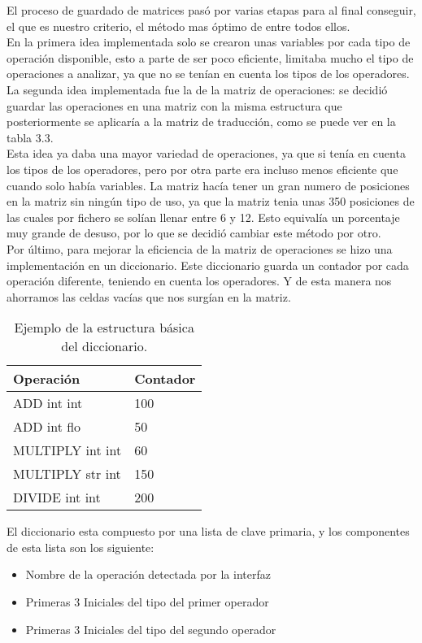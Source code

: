 El proceso de guardado de matrices pasó por varias etapas para al final conseguir, el que es nuestro criterio, el método mas óptimo de entre todos ellos.\\

En la primera idea implementada solo se crearon unas variables por cada tipo de operación disponible, esto a parte de ser poco eficiente, limitaba mucho el tipo de operaciones a analizar, ya que no se tenían en cuenta los tipos de los operadores.\\

La segunda idea implementada fue la de la  matriz de operaciones: se decidió guardar las operaciones en una matriz con la misma estructura que posteriormente se aplicaría a la matriz de traducción, como se puede ver en la tabla 3.3.\\

Esta idea ya daba una mayor variedad de operaciones, ya que si tenía en cuenta los tipos de los operadores, pero por otra parte era incluso menos eficiente que cuando solo había variables. La matriz hacía tener un gran numero de posiciones en la matriz sin ningún tipo de uso, ya que la matriz tenia unas 350 posiciones de las cuales por fichero se solían llenar entre 6 y 12. Esto equivalía un porcentaje muy grande de desuso, por lo que se decidió cambiar este método por otro.\\

Por último, para mejorar la eficiencia de la matriz de operaciones se hizo una implementación en un diccionario. Este diccionario guarda un contador por cada operación diferente, teniendo en cuenta los operadores. Y de esta manera nos ahorramos las celdas vacías que nos surgían en la matriz.\\

\begin{table}[H]
\begin{center}
\begin{tabular}{|l|l|}
\hline
Operación & Contador \\
\hline \hline
ADD int int & 100 \\ \hline
ADD int flo & 50 \\ \hline
MULTIPLY int int & 60 \\ \hline
MULTIPLY str int & 150 \\ \hline
DIVIDE int int & 200 \\ \hline
\end{tabular}
\caption{Ejemplo de la estructura básica del diccionario.}

\label{tabla:sencilla}
\end{center}
\end{table}
El diccionario esta compuesto por una lista de clave primaria, y los componentes de esta lista son los siguiente:
\begin{itemize}
	\item Nombre de la operación detectada por la interfaz
	\item Primeras 3 Iniciales del tipo del primer operador 
	\item Primeras 3 Iniciales del tipo del segundo operador 
\end{itemize}

